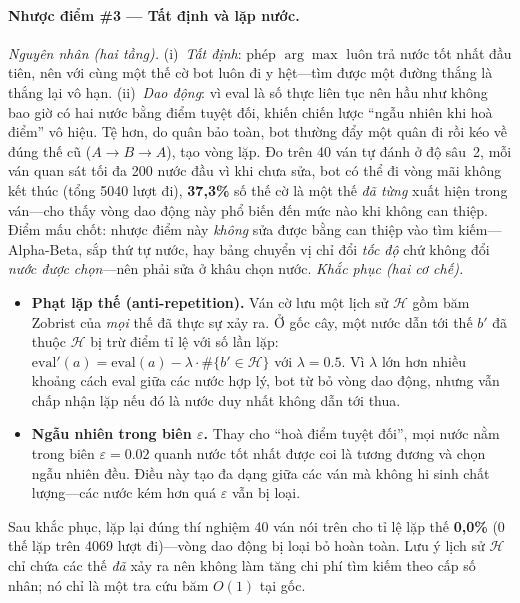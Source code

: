 \paragraph{Nhược điểm \#3 --- Tất định và lặp nước.}
\emph{Nguyên nhân (hai tầng).} (i)~\emph{Tất định}: phép $\arg\max$ luôn
trả nước tốt nhất đầu tiên, nên với cùng một thế cờ bot luôn đi y hệt---tìm
được một đường thắng là thắng lại vô hạn. (ii)~\emph{Dao động}: vì eval là
số thực liên tục nên hầu như không bao giờ có hai nước bằng điểm tuyệt
đối, khiến chiến lược ``ngẫu nhiên khi hoà điểm'' vô hiệu. Tệ hơn, do quân
bảo toàn, bot thường đẩy một quân đi rồi kéo về đúng thế cũ
($A\!\to\!B\!\to\!A$), tạo vòng lặp. Đo trên 40 ván tự đánh ở độ sâu~2,
mỗi ván quan sát tối đa 200 nước đầu vì khi chưa sửa, bot có thể đi vòng
mãi không kết thúc (tổng 5040 lượt đi), \textbf{37{,}3\%} số thế cờ là một thế \emph{đã từng}
xuất hiện trong ván---cho thấy vòng dao động này phổ biến đến mức nào khi
không can thiệp. Điểm mấu chốt:
nhược điểm này \emph{không} sửa được bằng can thiệp vào tìm kiếm---Alpha-Beta,
sắp thứ tự nước, hay bảng chuyển vị chỉ đổi \emph{tốc độ} chứ không đổi
\emph{nước được chọn}---nên phải sửa ở khâu chọn nước.
\emph{Khắc phục (hai cơ chế).}
\begin{itemize}
  \item \textbf{Phạt lặp thế (anti-repetition).} Ván cờ lưu một lịch sử
        $\mathcal H$ gồm băm Zobrist của \emph{mọi} thế đã thực sự xảy ra.
        Ở gốc cây, một nước dẫn tới thế $b'$ đã thuộc $\mathcal H$ bị trừ
        điểm tỉ lệ với số lần lặp:
        $\mathrm{eval}'(a)=\mathrm{eval}(a)-\lambda\cdot\#\{b'\in\mathcal
        H\}$ với $\lambda=0.5$. Vì $\lambda$ lớn hơn nhiều khoảng cách eval
        giữa các nước hợp lý, bot từ bỏ vòng dao động, nhưng vẫn chấp nhận
        lặp nếu đó là nước duy nhất không dẫn tới thua.
  \item \textbf{Ngẫu nhiên trong biên $\varepsilon$.} Thay cho ``hoà điểm
        tuyệt đối'', mọi nước nằm trong biên $\varepsilon=0.02$ quanh nước
        tốt nhất được coi là tương đương và chọn ngẫu nhiên đều. Điều này
        tạo đa dạng giữa các ván mà không hi sinh chất lượng---các nước
        kém hơn quá $\varepsilon$ vẫn bị loại.
\end{itemize}
Sau khắc phục, lặp lại đúng thí nghiệm 40 ván nói trên cho tỉ lệ lặp thế
\textbf{0{,}0\%} (0 thế lặp trên 4069 lượt đi)---vòng dao động bị loại bỏ
hoàn toàn. Lưu ý lịch sử $\mathcal H$ chỉ chứa các thế \emph{đã} xảy ra
nên không làm tăng chi phí tìm kiếm theo cấp số nhân; nó chỉ là một tra cứu
băm $O(1)$ tại gốc.
